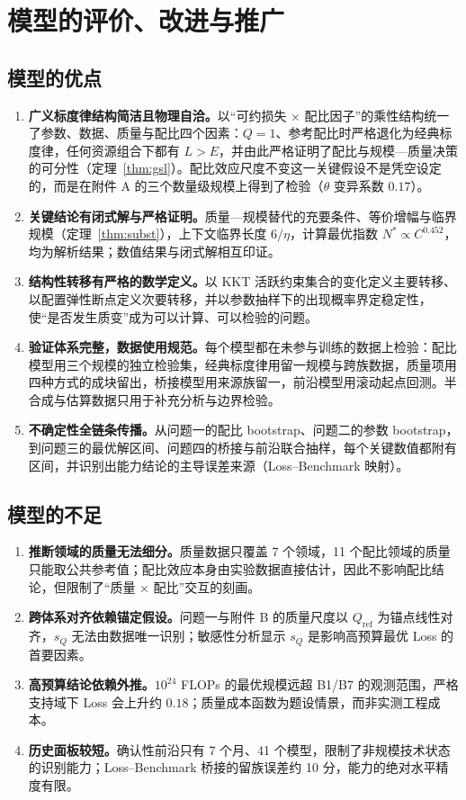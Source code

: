 \section{模型的评价、改进与推广}

\subsection{模型的优点}

\begin{enumerate}
\item \textbf{广义标度律结构简洁且物理自洽。}以“可约损失 × 配比因子”的乘性结构统一了参数、数据、质量与配比四个因素：$Q=1$、参考配比时严格退化为经典标度律，任何资源组合下都有 $L>E$，并由此严格证明了配比与规模—质量决策的可分性（定理~\ref{thm:gsl}）。配比效应尺度不变这一关键假设不是凭空设定的，而是在附件 A 的三个数量级规模上得到了检验（$\theta$ 变异系数 $0.17$）。
\item \textbf{关键结论有闭式解与严格证明。}质量—规模替代的充要条件、等价增幅与临界规模（定理~\ref{thm:subst}），上下文临界长度 $6/\eta$，计算最优指数 $N^*\propto C^{0.452}$，均为解析结果；数值结果与闭式解相互印证。
\item \textbf{结构性转移有严格的数学定义。}以 KKT 活跃约束集合的变化定义主要转移、以配置弹性断点定义次要转移，并以参数抽样下的出现概率界定稳定性，使“是否发生质变”成为可以计算、可以检验的问题。
\item \textbf{验证体系完整，数据使用规范。}每个模型都在未参与训练的数据上检验：配比模型用三个规模的独立检验集，经典标度律用留一规模与跨族数据，质量项用四种方式的成块留出，桥接模型用来源族留一，前沿模型用滚动起点回测。半合成与估算数据只用于补充分析与边界检验。
\item \textbf{不确定性全链条传播。}从问题一的配比 bootstrap、问题二的参数 bootstrap，到问题三的最优解区间、问题四的桥接与前沿联合抽样，每个关键数值都附有区间，并识别出能力结论的主导误差来源（Loss--Benchmark 映射）。
\end{enumerate}

\subsection{模型的不足}

\begin{enumerate}
\item \textbf{推断领域的质量无法细分。}质量数据只覆盖 7 个领域，11 个配比领域的质量只能取公共参考值；配比效应本身由实验数据直接估计，因此不影响配比结论，但限制了“质量 × 配比”交互的刻画。
\item \textbf{跨体系对齐依赖锚定假设。}问题一与附件 B 的质量尺度以 $Q_{\mathrm{ref}}$ 为锚点线性对齐，$s_Q$ 无法由数据唯一识别；敏感性分析显示 $s_Q$ 是影响高预算最优 Loss 的首要因素。
\item \textbf{高预算结论依赖外推。}$10^{24}$ FLOPs 的最优规模远超 B1/B7 的观测范围，严格支持域下 Loss 会上升约 $0.18$；质量成本函数为题设情景，而非实测工程成本。
\item \textbf{历史面板较短。}确认性前沿只有 7 个月、41 个模型，限制了非规模技术状态的识别能力；Loss--Benchmark 桥接的留族误差约 10 分，能力的绝对水平精度有限。
\end{enumerate}

